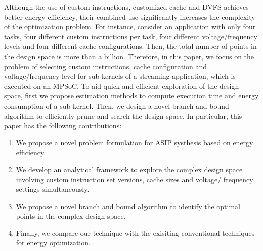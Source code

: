 Although the use of custom instructions, customized cache and DVFS
achieves better energy efficiency, their combined use significantly
increases the complexity of the optimization problem. For instance,
consider an application with only four tasks, four different custom
instructions per task, four different voltage/frequency levels and four
different cache configurations. Then, the total number of points in the
design space is more than a billion. Therefore, in this paper, we focus
on the problem of selecting custom instructions, cache configuration and
voltage/frequency level for sub-kernels of a streaming application, which
is executed on an MPSoC. To aid quick and efficient exploration of the
design space, first we propose estimation methods to compute execution
time and energy consumption of a sub-kernel. Then, we design a novel
branch and bound algorithm to efficiently prune and search the design
space. In particular, this paper has the following contributions:

\begin{enumerate}

\item We propose a novel problem formulation for ASIP systhesis based on
energy efficiency.

\item We develop an analytical framework to explore the complex design
space involving custom instruction set versions, cache sizes and voltage/
frequency settings simultaneously.

\item We propose a novel branch and bound algorithm to identify the
optimal points in the complex design space.

\item Finally, we compare our technique with the exisiting conventional
techniques for energy optimization.

\end{enumerate}